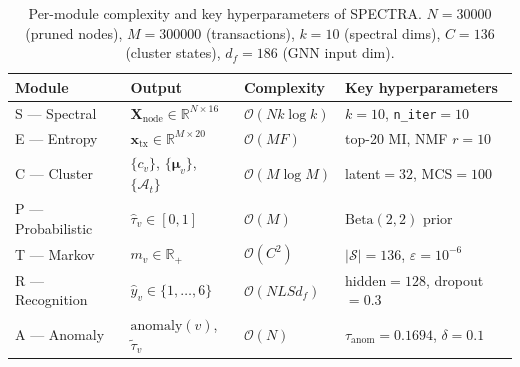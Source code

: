 \begin{table}[t]
  \caption{Per-module complexity and key hyperparameters of \textsc{SPECTRA}.
           $N=\num{30000}$ (pruned nodes), $M=\num{300000}$ (transactions),
           $k=10$ (spectral dims), $C=136$ (cluster states),
           $d_f=186$ (GNN input dim).}
  \label{tab:module_summary}
  \centering
  \renewcommand{\arraystretch}{1.15}
  \begin{tabular}{@{}lllp{3.6cm}@{}}
    \toprule
    \textbf{Module} & \textbf{Output} & \textbf{Complexity} & \textbf{Key hyperparameters} \\
    \midrule
    S — Spectral  & $\mathbf{X}_{\mathrm{node}} \!\in\! \mathbb{R}^{N\times 16}$
                  & $\mathcal{O}(Nk\log k)$
                  & $k{=}10$, \texttt{n\_iter}$=10$ \\
    E — Entropy   & $\mathbf{x}_{\mathrm{tx}} \!\in\! \mathbb{R}^{M\times 20}$
                  & $\mathcal{O}(MF)$
                  & top-20 MI, NMF $r{=}10$ \\
    C — Cluster   & $\{c_v\}$, $\{\boldsymbol{\mu}_v\}$, $\{\mathcal{A}_t\}$
                  & $\mathcal{O}(M\log M)$
                  & latent$=32$, MCS$=100$ \\
    P — Probabilistic & $\hat{\tau}_v \!\in\! [0,1]$
                  & $\mathcal{O}(M)$
                  & $\mathrm{Beta}(2,2)$ prior \\
    T — Markov    & $m_v \!\in\! \mathbb{R}_{+}$
                  & $\mathcal{O}(C^2)$
                  & $|\mathcal{S}|{=}136$, $\varepsilon{=}10^{-6}$ \\
    R — Recognition & $\hat{y}_v \!\in\! \{1,\ldots,6\}$
                  & $\mathcal{O}(NLSd_f)$
                  & hidden$=128$, dropout$=0.3$ \\
    A — Anomaly   & $\mathrm{anomaly}(v)$, $\tilde{\tau}_v$
                  & $\mathcal{O}(N)$
                  & $\tau_{\mathrm{anom}}{=}0.1694$, $\delta{=}0.1$ \\
    \bottomrule
  \end{tabular}
\end{table}

